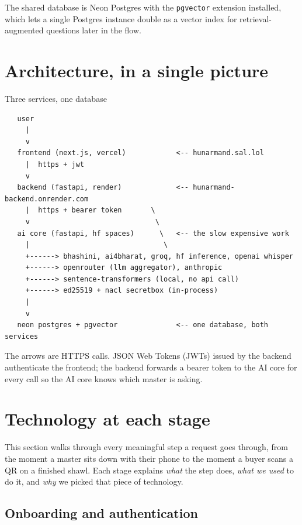 \documentclass[11pt,a4paper]{article}
\begin{document}
The shared database is Neon Postgres with the \texttt{pgvector}
extension installed, which lets a single Postgres instance double as a
vector index for retrieval-augmented questions later in the flow.

\section{Architecture, in a single picture}

\begin{stage}{Three services, one database}
\begin{verbatim}
   user
     |
     v
   frontend (next.js, vercel)            <-- hunarmand.sal.lol
     |  https + jwt
     v
   backend (fastapi, render)             <-- hunarmand-backend.onrender.com
     |  https + bearer token       \
     v                              \
   ai core (fastapi, hf spaces)      \   <-- the slow expensive work
     |                                \
     +------> bhashini, ai4bharat, groq, hf inference, openai whisper
     +------> openrouter (llm aggregator), anthropic
     +------> sentence-transformers (local, no api call)
     +------> ed25519 + nacl secretbox (in-process)
     |
     v
   neon postgres + pgvector              <-- one database, both services
\end{verbatim}
\end{stage}

The arrows are HTTPS calls. JSON Web Tokens (JWTs) issued by the backend
authenticate the frontend; the backend forwards a bearer token to the
AI core for every call so the AI core knows which master is asking.

\section{Technology at each stage}

This section walks through every meaningful step a request goes through,
from the moment a master sits down with their phone to the moment a
buyer scans a QR on a finished shawl. Each stage explains \emph{what}
the step does, \emph{what we used} to do it, and \emph{why} we picked
that piece of technology.

\subsection{Onboarding and authentication}
\end{document}
